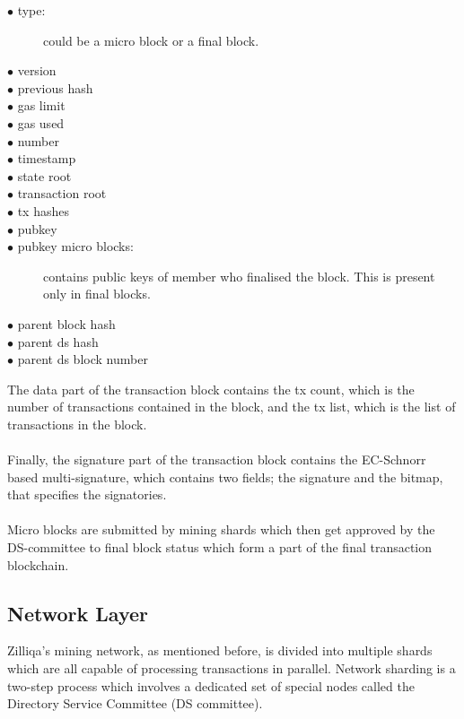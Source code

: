 \documentclass[a4paper,twoside,phd]{BYUPhys}
\begin{document}
\begin{description}
\item[$\bullet$ type:] could be a micro block or a final block.
\item[$\bullet$ version] 
\item[$\bullet$ previous hash]
\item[$\bullet$ gas limit]
\item[$\bullet$ gas used]
\item[$\bullet$ number]
\item[$\bullet$ timestamp]
\item[$\bullet$ state root]
\item[$\bullet$ transaction root]
\item[$\bullet$ tx hashes]
\item[$\bullet$ pubkey]
\item[$\bullet$ pubkey micro blocks:] contains public keys of member who finalised the block. This is present only in final blocks.
\item[$\bullet$ parent block hash]
\item[$\bullet$ parent ds hash]
\item[$\bullet$ parent ds block number]
\end{description}
The data part of the transaction block contains the tx count, which is the number of transactions contained in the block, and the tx list, which is the list of transactions in the block\cite{}.
\\
\\
Finally, the signature part of the transaction block contains the EC-Schnorr based multi-signature, which contains two fields; the signature and the bitmap, that specifies the signatories\cite{}.  
\\
\\
Micro blocks are submitted by mining shards which then get approved by the DS-committee to final block status which form a part of the final transaction blockchain.
\subsection{Network Layer}
 Zilliqa's mining network, as mentioned before, is divided into multiple shards which are all capable of processing transactions in parallel. Network sharding is a two-step process which involves a dedicated set of special nodes called the Directory Service Committee (DS committee)\cite{}. 
\end{document}
